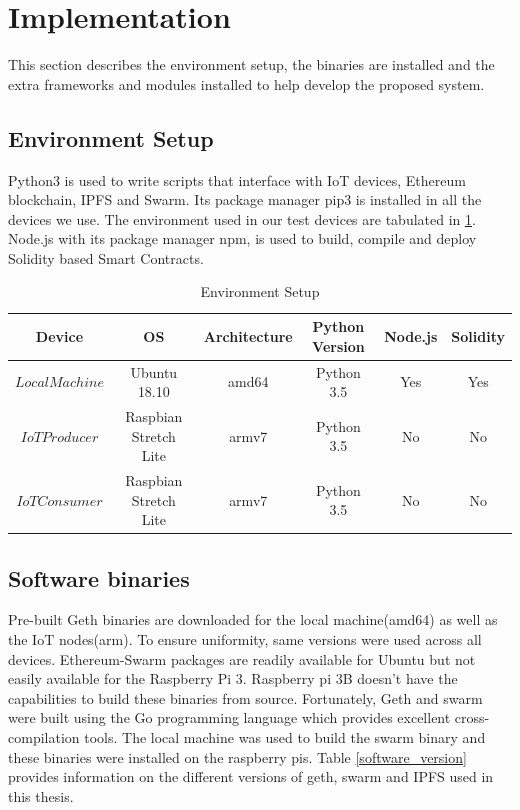 \documentclass[11pt,openright]{report}
\begin{document}
\section{Implementation}
This section describes the environment setup, the binaries are installed and the extra frameworks and modules installed to help develop the proposed system.
\subsection{Environment Setup}
Python3 is used to write scripts that interface with IoT devices, Ethereum blockchain, IPFS and Swarm. Its package manager pip3 is installed in all the devices we use. The environment used in our test devices are tabulated in \ref{environment_setup}. Node.js with its package manager npm, is used to build, compile and deploy Solidity based Smart Contracts. 

\begin{table}[!htbp]
	\renewcommand{\arraystretch}{1}
	\caption{Environment Setup}
	\label{environment_setup}
	\centering
	\begin{tabular}{|c|c|c|c|c|c|}
		\hline
		\bfseries Device & \bfseries OS & \bfseries Architecture & \bfseries Python Version & \bfseries Node.js & \bfseries Solidity\\
		\hline\hline
		$Local Machine$ & Ubuntu 18.10 & amd64 & Python 3.5 &  Yes & Yes\\ \hline
		$IoT Producer$ & Raspbian Stretch Lite & armv7 & Python 3.5 &  No & No\\ \hline
		$IoT Consumer$ & Raspbian Stretch Lite & armv7 & Python 3.5 &  No & No\\ \hline
	\end{tabular}
\end{table}

\subsection{Software binaries}
Pre-built Geth binaries are downloaded for the local machine(amd64) as well as the IoT nodes(arm). To ensure uniformity, same versions were used across all devices. Ethereum-Swarm packages are readily available for Ubuntu but not easily available for the Raspberry Pi 3.
Raspberry pi 3B doesn't have the capabilities to build these binaries from source.
Fortunately, Geth and swarm were built using the Go programming language which provides excellent cross-compilation tools. The local machine was used to build the swarm binary and these binaries were installed on the raspberry pis. Table \ref{software_version} provides information on the different versions of geth, swarm and IPFS used in this thesis.
\end{document}
